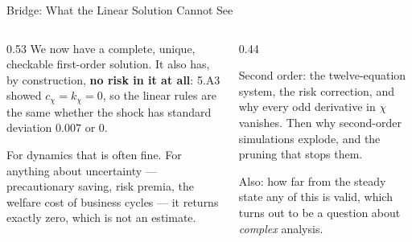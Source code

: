 \begin{frame}{Bridge: What the Linear Solution Cannot See}
\begin{columns}[T]
\begin{column}{0.53\textwidth}
\small
We now have a complete, unique, checkable first-order solution. It also has, by construction, \textbf{no risk in it at all}: 5.A3 showed $c_\chi=k_\chi=0$, so the linear rules are the same whether the shock has standard deviation $0.007$ or $0$.
\medskip

For dynamics that is often fine. For anything about uncertainty --- precautionary saving, risk premia, the welfare cost of business cycles --- it returns exactly zero, which is not an estimate.
\end{column}
\begin{column}{0.44\textwidth}
\begin{conceptbox}[title=\textbf{Next (5.A5)}]\small
Second order: the twelve-equation system, the risk correction, and why every odd derivative in $\chi$ vanishes. Then why second-order simulations explode, and the pruning that stops them.
\end{conceptbox}
\medskip
\begin{examplebox}\footnotesize
Also: how far from the steady state any of this is valid, which turns out to be a question about \emph{complex} analysis.
\end{examplebox}
\end{column}
\end{columns}
\end{frame}


